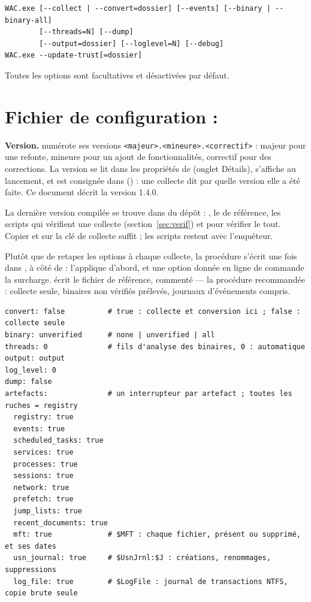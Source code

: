 \documentclass[11pt,a4paper,oneside]{report}
\begin{document}
\begin{lstlisting}
WAC.exe [--collect | --convert=dossier] [--events] [--binary | --binary-all]
        [--threads=N] [--dump]
        [--output=dossier] [--loglevel=N] [--debug]
WAC.exe --update-trust[=dossier]
\end{lstlisting}

Toutes les options sont facultatives et désactivées par défaut.

\section{Fichier de configuration : }

\textbf{Version.} \wac{} numérote ses versions \texttt{<majeur>.<mineure>.<correctif>} :
majeur pour une refonte, mineure pour un ajout de fonctionnalités, correctif
pour des corrections. La version se lit dans les propriétés de
 (onglet Détails), s'affiche au lancement, et est consignée
dans  () : une collecte dit par
quelle version elle a été faite. Ce document décrit la version 1.4.0.

La dernière version compilée se trouve dans  du dépôt :
, le  de référence, les scripts qui
vérifient une collecte (section~\ref{sec:verif}) et 
pour vérifier le tout. Copier  et  sur la
clé de collecte suffit ; les scripts restent avec l'enquêteur.

Plutôt que de retaper les options à chaque collecte, la procédure s'écrit une
fois dans , à côté de  : \wac{} l'applique
d'abord, et une option donnée en ligne de commande la surcharge.
 écrit le fichier de référence, commenté — la procédure
recommandée : collecte seule, binaires non vérifiés prélevés, journaux
d'événements compris.

\begin{lstlisting}
convert: false          # true : collecte et conversion ici ; false : collecte seule
binary: unverified      # none | unverified | all
threads: 0              # fils d'analyse des binaires, 0 : automatique
output: output
log_level: 0
dump: false
artefacts:              # un interrupteur par artefact ; toutes les ruches = registry
  registry: true
  events: true
  scheduled_tasks: true
  services: true
  processes: true
  sessions: true
  network: true
  prefetch: true
  jump_lists: true
  recent_documents: true
  mft: true             # $MFT : chaque fichier, présent ou supprimé, et ses dates
  usn_journal: true     # $UsnJrnl:$J : créations, renommages, suppressions
  log_file: true        # $LogFile : journal de transactions NTFS, copie brute seule
\end{lstlisting}
\end{document}
